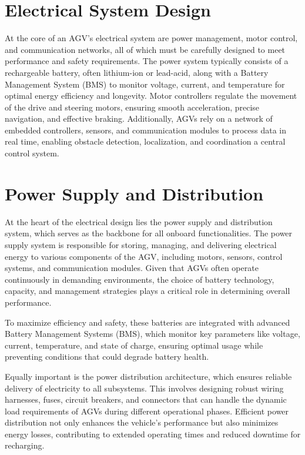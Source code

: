 \documentclass[../../main]{subfiles}
\begin{document}
\section{Electrical System Design}

At the core of an AGV’s electrical system are power management, motor control, 
and communication networks, all of which must be carefully designed to meet 
performance and safety requirements. The power system typically consists of 
a rechargeable battery, often lithium-ion or lead-acid, along with a Battery 
Management System (BMS) to monitor voltage, current, and temperature for 
optimal energy efficiency and longevity. Motor controllers regulate the 
movement of the drive and steering motors, ensuring smooth acceleration, 
precise navigation, and effective braking. Additionally, AGVs rely on a 
network of embedded controllers, sensors, and communication modules to 
process data in real time, enabling obstacle detection, localization, and 
coordination a central control system.
\newpage
\section{Power Supply and Distribution}

At the heart of the electrical design lies the power supply and distribution system, 
which serves as the backbone for all onboard functionalities. 
The power supply system is responsible for storing, managing, 
and delivering electrical energy to various components of the AGV, 
including motors, sensors, control systems, and communication modules. 
Given that AGVs often operate continuously in demanding environments, 
the choice of battery technology, capacity, and management strategies 
plays a critical role in determining overall performance. 

To maximize efficiency and safety, these batteries are integrated 
with advanced Battery Management Systems (BMS), 
which monitor key parameters like voltage, current, temperature, 
and state of charge, ensuring optimal usage while preventing conditions 
that could degrade battery health. 

Equally important is the power distribution architecture, 
which ensures reliable delivery of electricity to all subsystems. 
This involves designing robust wiring harnesses, fuses, circuit breakers, 
and connectors that can handle the dynamic load requirements 
of AGVs during different operational phases. 
Efficient power distribution not only enhances the vehicle's performance 
but also minimizes energy losses, contributing to extended operating times 
and reduced downtime for recharging. 
\end{document}
